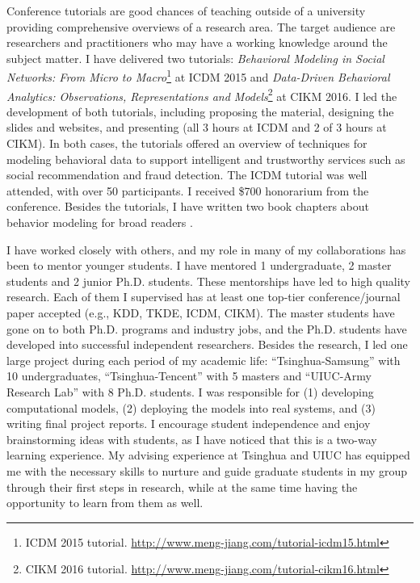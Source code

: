 \documentclass[10.5pt]{article}
\begin{document}
Conference tutorials are good chances of teaching outside of a university providing comprehensive overviews of a research area. The target audience are researchers and practitioners who may have a working knowledge around the subject matter. I have delivered two tutorials: \textit{Behavioral Modeling in Social Networks: From Micro to Macro}\footnote{ICDM 2015 tutorial. \url{http://www.meng-jiang.com/tutorial-icdm15.html}} \cite{jiang2015behavior} at ICDM 2015 and \textit{Data-Driven Behavioral Analytics: Observations, Representations and Models}\footnote{CIKM 2016 tutorial. \url{http://www.meng-jiang.com/tutorial-cikm16.html}} \cite{jiang2016data} at CIKM 2016. I led the development of both tutorials, including proposing the material, designing the slides and websites, and presenting (all 3 hours at ICDM and 2 of 3 hours at CIKM). In both cases, the tutorials offered an overview of techniques for modeling behavioral data to support intelligent and trustworthy services such as social recommendation and fraud detection. The ICDM tutorial was well attended, with over 50 participants. I received \$700 honorarium from the conference. Besides the tutorials, I have written two book chapters about behavior modeling for broad readers \cite{jiang2016mining,jiang2016behavior}.

\vskip 0.12in
\vskip 0.02in

I have worked closely with others, and my role in many of my collaborations has been to mentor younger students. I have mentored 1 undergraduate, 2 master students and 2 junior Ph.D. students. These mentorships have led to high quality research. Each of them I supervised has at least one top-tier conference/journal paper accepted (e.g., KDD, TKDE, ICDM, CIKM). The master students have gone on to both Ph.D. programs and industry jobs, and the Ph.D. students have developed into successful independent researchers. Besides the research, I led one large project during each period of my academic life: ``Tsinghua-Samsung'' with 10 undergraduates, ``Tsinghua-Tencent'' with 5 masters and ``UIUC-Army Research Lab'' with 8 Ph.D. students. I was responsible for (1) developing computational models, (2) deploying the models into real systems, and (3) writing final project reports. I encourage student independence and enjoy brainstorming ideas with students, as I have noticed that this is a two-way learning experience. My advising experience at Tsinghua and UIUC has equipped me with the necessary skills to nurture and guide graduate students in my group through their first steps in research, while at the same time having the opportunity to learn from them as well.
\end{document}
